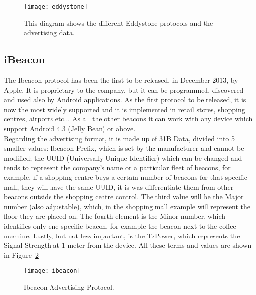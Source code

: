 \clearpage
\begin{figure}[t]
	\centering
	\texttt{[image: eddystone]}
	\caption{This diagram shows the different Eddystone protocols and the advertising data.}
	\label{fig:eddystone}
\end{figure}
\vspace*{0cm}

\subsection{iBeacon}
The Ibeacon protocol has been the first to be released, in December 2013, by Apple. It is proprietary to the company, but it can be programmed, discovered and used also by Android applications. As the first protocol to be released, it is now the most widely supported and it is implemented in retail stores, shopping centres, airports etc... As all the other beacons it can work with any device which support Android 4.3 (Jelly Bean) or above.\\
Regarding the advertising format, it is made up of 31B Data, divided into 5 smaller values: Ibeacon Prefix, which is set by the manufacturer and cannot be modified; the UUID (Universally Unique Identifier) which can be changed and tends to represent the company's name or a particular fleet of beacons, for example, if a shopping centre buys a certain number of beacons for that specific mall, they will have the same UUID, it is was differentiate them from other beacons outside the shopping centre control. The third value will be the Major number (also adjustable), which, in the shopping mall example will represent the floor they are placed on. The fourth element is the Minor number, which identifies only one specific beacon, for example the beacon next to the coffee machine.
Lastly, but not less important, is the TxPower, which represents the Signal Strength at 1 meter from the device.
All these terms and values are shown in Figure~\ref{fig:ibeacon}

\clearpage
\begin{figure}[t!]
	\centering
	\texttt{[image: ibeacon]}
	\caption{Ibeacon Advertising Protocol.}
	\label{fig:ibeacon}
\end{figure}
\vspace*{0cm}

\clearpage
